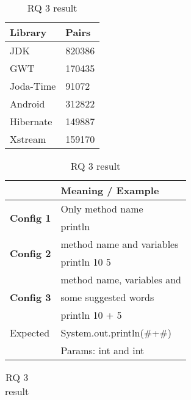 \begin{table}[]
\tiny
\caption{Corpus, configurations and RQ3 result}
\label{tbl:CombineConfigTables}
\begin{subtable}[t]{0.1\textwidth}
\centering
\caption{Corpus}
\label{tbl:DataPreparation}
\begin{tabular}{|l|l|}
\hline
\textbf{Library }  & \textbf{Pairs} \\ \hline
JDK       & 820386         \\ \hline
GWT       & 170435         \\ \hline
Joda-Time & 91072          \\ \hline
Android   & 312822         \\ \hline
Hibernate & 149887         \\ \hline
Xstream   & 159170         \\ \hline
\end{tabular}
\end{subtable}
\hfill
\begin{subtable}[t]{0.2\textwidth}
\centering
\tiny
\caption{Configurations}
\label{tbl:Config2}
\begin{tabular}{|l|l|}
\hline
                     & \textbf{Meaning / Example    }                                                                                              \\ \hline
\multirow{2}{*}{\textbf{Config 1}} & Only method name                                                               \\ \cline{2-2} 
                     &  println                                                                   \\ \hline
\multirow{2}{*}{\textbf{Config 2}} &  method name and variables                                                                                       \\ \cline{2-2} 
                         & println 10 5                                        \\ \hline
\multirow{3}{*}{\textbf{Config 3}} & method name, variables and                                                                                  \\ 
 & some suggested words \\\cline{2-2}
               &      println 10 + 5       
                     \\ \hline
Expected &                          
System.out.println(\#+\#)
\\ & Params: int and int     
                     \\ \hline
\end{tabular}
\end{subtable}
\hfill
\begin{subtable}[t]{0.5\textwidth}
\tiny
\flushright
\caption{RQ 3 result}
\begin{tabular}{|l|l|l|l|l|l|}
\hline
              

\end{tabular}
\end{subtable}
\end{table}
